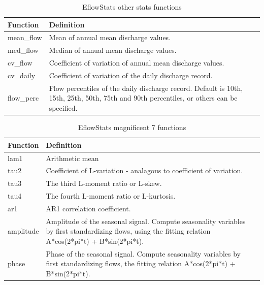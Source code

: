 \documentclass[a4paper,11pt]{article}\usepackage[]{graphicx}\usepackage[]{color}
\begin{document}
\begin{table}[ht]
  \centering
  \begin{threeparttable}[b]
  \caption{EflowStats other stats functions}
  \label{tab:otherStats}
\begin{tabularx}{\textwidth}{lXl}
  \hline
\textbf{Function} & \textbf{Definition} \\ 
  \hline
  mean\_flow & Mean of annual mean discharge values. \\
  med\_flow & Median of annual mean discharge values. \\
  cv\_flow & Coefficient of variation of annual mean discharge values. \\
  cv\_daily & Coefficient of variation of the daily discharge record. \\
  flow\_perc & Flow percentiles of the daily discharge record. Default is 10th, 15th, 25th, 50th, 75th and 90th percentiles, or others can be specified. \\
   \hline
\end{tabularx}
\end{threeparttable}
\end{table}

\begin{table}[ht]
  \centering
  \begin{threeparttable}[b]
  \caption{EflowStats magnificent 7 functions}
  \label{tab:mag7Stats}
\begin{tabularx}{\textwidth}{lXl}
  \hline
\textbf{Function} & \textbf{Definition} \\ 
  \hline
  lam1 & Arithmetic mean \\
  tau2 & Coefficient of L-variation - analagous to coefficient of variation. \\
  tau3 & The third L-moment ratio or L-skew. \\
  tau4 & The fourth L-moment ratio or L-kurtosis. \\
  ar1 & AR1 correlation coefficient. \\
  amplitude & Amplitude of the seasonal signal. Compute seasonality variables by first standardizing flows, using the fitting relation A*cos(2*pi*t) + B*sin(2*pi*t). \\
  phase & Phase of the seasonal signal. Compute seasonality variables by first standardizing flows, the fitting relation A*cos(2*pi*t) + B*sin(2*pi*t). \\
   \hline
\end{tabularx}
\end{threeparttable}
\end{table}
\end{document}
